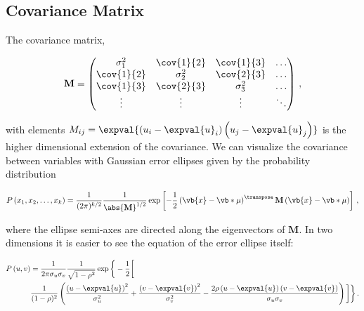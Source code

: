 \subsection{Covariance Matrix}
\label{stats:corr_covar:covar_matrix}

The covariance matrix,

\begin{align}
  \mathbf{M} = \begin{pmatrix}
    \sigma_1^2   & \cov{1}{2} & \cov{1}{3} & \ldots \\
    \cov{1}{2}   & \sigma_2^2 & \cov{2}{3} & \ldots \\
    \cov{1}{3}   & \cov{2}{3} & \sigma_3^2 & \ldots \\
    \vdots       & \vdots     & \vdots     & \ddots
  \end{pmatrix}\,,
\end{align}

\noindent with elements $M_{ij} = \expval{\left(u_{i} - \expval{u}_{i}\right)\left(u_{j}-\expval{u}_{j}\right)}$
is the higher dimensional extension of the covariance.
We can visualize the covariance between variables with
Gaussian error ellipses given by the probability distribution

\begin{equation}\label{eq:stats:P_error_ellipse_k}
P\left(x_{1},x_{2},\ldots,x_{k}\right) = \frac{1}{(2\pi)^{k/2}}\frac{1}{\abs{\mathbf{M}}^{1/2}}\exp\left[-\frac{1}{2}\left(\vb{x}-\vb*{\mu}\right)^{\transpose}\mathbf{M}\left(\vb{x}-\vb*{\mu}\right)\right]\,,
\end{equation}

\noindent where the ellipse semi-axes are directed along the eigenvectors of $\mathbf{M}$.
In two dimensions it is easier to see the equation of the error ellipse itself:

\begin{equation}\label{eq:stats:P_error_ellipse_2}
\begin{split}
P\left(u,v\right) &= \frac{1}{2\pi\sigma_{u}\sigma_{v}}\frac{1}{\sqrt{1-\rho^{2}}}\exp\bigg\{-\frac{1}{2}\bigg[ \\
&\frac{1}{(1-\rho)^{2}}\left(\frac{\left(u-\expval{u}\right)^{2}}{\sigma_{u}^{2}}+\frac{\left(v-\expval{v}\right)^{2}}{\sigma_{v}^{2}}-\frac{2\rho \left(u-\expval{u}\right)\left(v-\expval{v}\right)}{\sigma_{u}\sigma_{v}}\right)\bigg]\bigg\}\,.
\end{split}
\end{equation}

